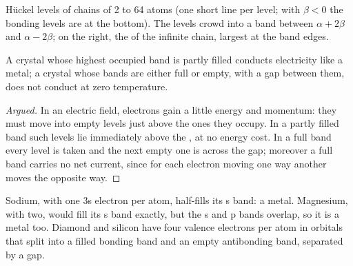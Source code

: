 \begin{omfigure}

{\small Hückel levels of chains of 2 to 64 atoms (one short line per level;
with $\beta < 0$ the bonding levels are at the bottom). The levels crowd into a band
between $\alpha + 2\beta$ and $\alpha - 2\beta$; on the right, the  of the infinite
chain, largest at the band edges.}
\end{omfigure}

\begin{proposition}\label{prop:b3:solid-state:filling}
A crystal whose highest occupied band is partly filled conducts electricity
like a metal; a crystal whose bands are either full or empty, with a gap
between them, does not conduct at zero temperature.
\end{proposition}

\begin{proof}[Argued]
In an electric field, electrons gain a little energy and momentum: they must
move into empty levels just above the ones they occupy. In a partly filled
band such levels lie immediately above the , at no energy cost. In
a full band every level is taken and the next empty one is across the gap;
moreover a full band carries no net current, since for each electron moving
one way another moves the opposite way.
\end{proof}

Sodium, with one 3s electron per atom, half-fills its s band: a metal.
Magnesium, with two, would fill its s band exactly, but the s and p bands
overlap, so it is a metal too. Diamond and silicon have four valence electrons
per atom in orbitals that split into a filled bonding band and an empty
antibonding band, separated by a gap.

